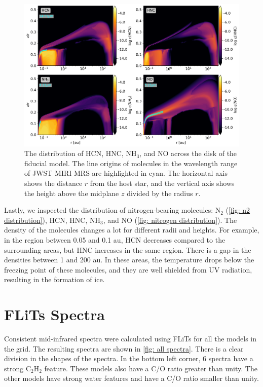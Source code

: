\documentclass[twoside, single, authoryear, semicolon, 12pt]{lion-msc}
\newcommand{\4}{$_4$}
\newcommand{\3}{$_3$}
\newcommand{\2}{$_2$}
\begin{document}
\begin{figure}[H]
    \centering
    \includegraphics[width=\linewidth]{Figures/Abundance2.pdf}
    \caption{The distribution of HCN, HNC, NH\3, and NO across the disk of the fiducial model. The line origins of molecules in the wavelength range of JWST MIRI MRS are highlighted in cyan. The horizontal axis shows the distance $r$ from the host star, and the vertical axis shows the height above the midplane $z$ divided by the radius $r$.}
    \label{fig: nitrogen distribution}
\end{figure}
Lastly, we inspected the distribution of nitrogen-bearing molecules: N\2 (\autoref{fig: n2 distribution}), HCN, HNC, NH\3, and NO (\autoref{fig: nitrogen distribution}). The density of the molecules changes a lot for different radii and heights. For example, in the region between 0.05 and 0.1 au, HCN decreases compared to the surrounding areas, but HNC increases in the same region. There is a gap in the densities between 1 and 200 au. In these areas, the temperature drops below the freezing point of these molecules, and they are well shielded from UV radiation, resulting in the formation of ice. 
\newpage
\section{FLiTs Spectra}
Consistent mid-infrared spectra were calculated using FLiTs for all the models in the grid. The resulting spectra are shown in \autoref{fig: all spectra}. There is a clear division in the shapes of the spectra. In the bottom left corner, 6 spectra have a strong C\2H\2 feature. These models also have a C/O ratio greater than unity. The other models have strong water features and have a C/O ratio smaller than unity. 
\end{document}
